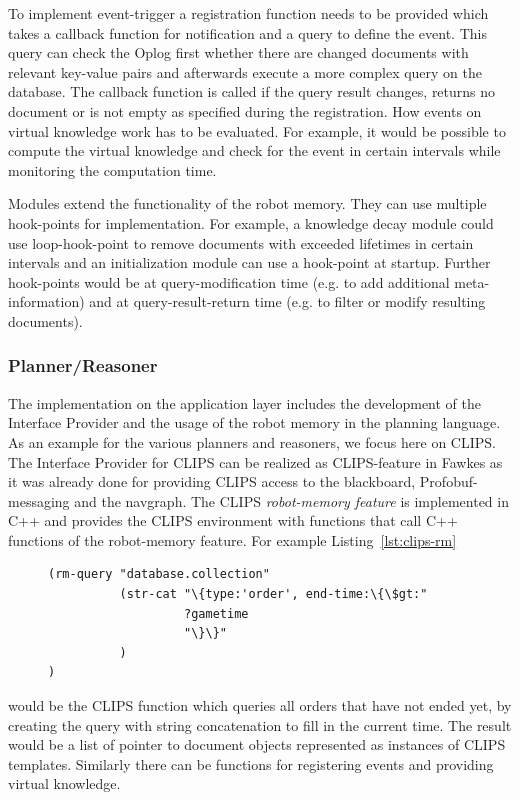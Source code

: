 \documentclass[a4paper,11pt]{article}
\newcommand{\reflst}[1]{Listing~\ref{#1}}
\begin{document}
To implement event-trigger a registration function needs to be
provided which takes a callback function for notification and a query
to define the event. This query can check the Oplog first whether
there are changed documents with relevant key-value pairs and
afterwards execute a more complex query on the database. The callback
function is called if the query result changes, returns no document or
is not empty as specified during the registration. How events on
virtual knowledge work has to be evaluated. For example, it would be
possible to compute the virtual knowledge and check for the event in
certain intervals while monitoring the computation time.

Modules extend the functionality of the robot memory. They can use
multiple hook-points for implementation. For example, a knowledge decay
module could use loop-hook-point to remove documents with exceeded
lifetimes in certain intervals and an initialization module can use a
hook-point at startup. Further hook-points would be at
query-modification time (e.g. to add additional meta-information) and
at query-result-return time (e.g. to filter or modify resulting
documents).

\subsubsection{Planner/Reasoner}
\label{sec:impl-planner}
The implementation on the application layer includes the development
of the Interface Provider and the usage of the robot memory in the
planning language. As an example for the various planners and
reasoners, we focus here on CLIPS. The Interface Provider for CLIPS
can be realized as CLIPS-feature in Fawkes as it was already done for
providing CLIPS access to the blackboard, Profobuf-messaging and the
navgraph. The CLIPS \emph{robot-memory feature} is implemented in C++
and provides the CLIPS environment with functions that call C++
functions of the robot-memory feature. For example \reflst{lst:clips-rm}
\begin{figure}
  \begin{lstlisting}[showlines,style=ReallySmallCLIPS, caption={CLIPS function to execute a query},
  label=lst:clips-rm,
  emph={skill, args, state, target, res},
  emphstyle=\bfseries\color{green!80!black},
  emph={[2]\?skill, \$\?args, wait-for-lock, \?target, use,
  WAIT-FOR-LOCK, SKILL-EXECUTION, running},
  emphstyle={[2]\bfseries\color{blue!80!black}},
  morekeywords={retract, assert, modify, skill-call, skill-to-execute,
    wait-for-lock}]
(rm-query "database.collection"
          (str-cat "\{type:'order', end-time:\{\$gt:"
                   ?gametime
                   "\}\}"
          )
)
\end{lstlisting} %
\end{figure}
would be the CLIPS function which queries all orders that have not
ended yet, by creating the query with string concatenation to fill in
the current time. The result would be a list of pointer to document
objects represented as instances of CLIPS templates. Similarly there
can be functions for registering events and providing virtual
knowledge.
\end{document}
